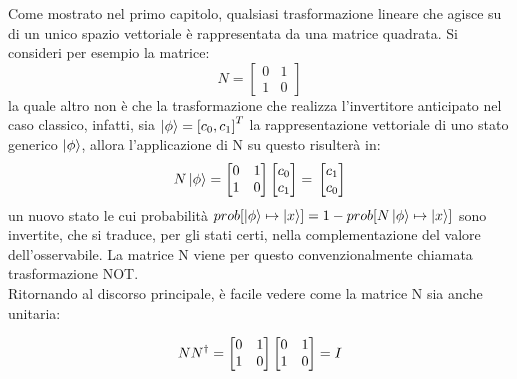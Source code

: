 \documentclass[12pt,a4paper,openright]{report}
\begin{document}
Come mostrato nel primo capitolo, qualsiasi trasformazione lineare che agisce su di un unico spazio vettoriale è rappresentata da una matrice quadrata. Si consideri per esempio la matrice:
\[
   N = \begin{bmatrix}
        0 & 1 \\
        1 & 0
    \end{bmatrix}
\]
la quale altro non è che la trasformazione che realizza l'invertitore anticipato nel caso classico, infatti, sia $\ket{\phi} = {[c_0, c_1]}^T$ 
la rappresentazione vettoriale di uno stato generico $\ket{\phi}$, allora l'applicazione di N su questo risulterà in: 
\[
    N\ket{\phi}=
    \begin{bmatrix}
        0 & 1 \\
        1 & 0
    \end{bmatrix}
    \begin{bmatrix}
        c_0 \\ c_1
    \end{bmatrix}=\\
    \begin{bmatrix}
        c_1 \\
        c_0
    \end{bmatrix}
\]
un nuovo stato le cui probabilità $prob[\ket{\phi} \mapsto \ket{x}] = 1 - prob[N\ket{\phi} \mapsto \ket{x}]$ sono invertite,
che si traduce, per gli stati certi, nella complementazione del valore dell'osservabile. La matrice N viene per questo convenzionalmente chiamata trasformazione NOT.\\
Ritornando al discorso principale, è facile vedere come la matrice N sia anche unitaria:

\[
    NN^{\dag} = 
    \begin{bmatrix}
        0 & 1 \\
        1 & 0
    \end{bmatrix}
    \begin{bmatrix}
        0 & 1 \\
        1 & 0
    \end{bmatrix}=\\
    I
\]
\par
\end{document}
